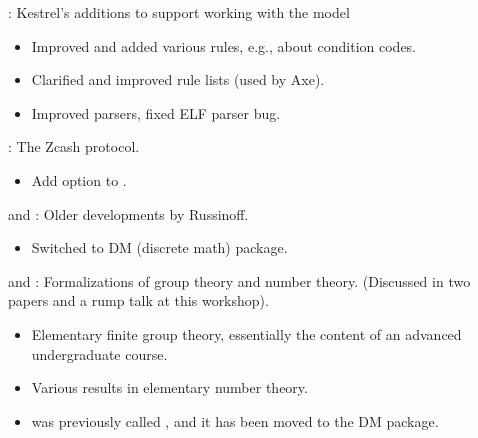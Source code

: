 
\begin{frame}

\implibtitle

:
Kestrel's additions to support working with the  model
\begin{itemize}
\item Improved and added various rules, e.g., about condition codes.
\item Clarified and improved rule lists (used by Axe).
\item Improved parsers, fixed ELF parser bug.
\end{itemize}

\end{frame}


\begin{frame}

\implibtitle

:
The Zcash protocol.
\begin{itemize}
\item Add  option to .
\end{itemize}

\end{frame}


\begin{frame}

\implibtitle

 and :
Older developments by Russinoff.
\begin{itemize}
\item Switched to DM (discrete math) package.
\end{itemize}

\end{frame}


\begin{frame}

\implibtitle

 and :
Formalizations of group theory and number theory.
(Discussed in two papers and a rump talk at this workshop).
\begin{itemize}
\item Elementary finite group theory,
  essentially the content of an advanced undergraduate course.
\item Various results in elementary number theory.
\item {} was previously called
  , and it has been moved to the DM
  package.
\end{itemize}

\end{frame}

